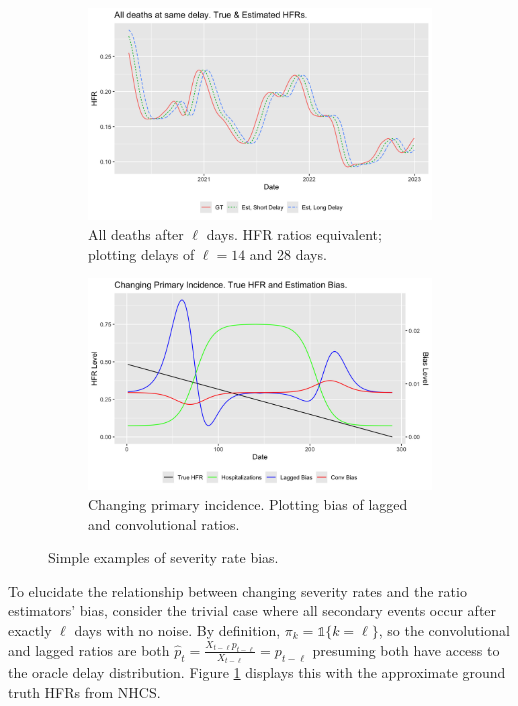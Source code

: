 \documentclass{article}
\begin{document}
\begin{figure}
     \centering
     \begin{subfigure}[b]{0.45\linewidth}
         \centering
         \includegraphics[width=\linewidth]{Figs/sim_onehot.png}
         \caption{All deaths after $\ell$ days. HFR ratios equivalent; plotting delays of $\ell=14$ and 28 days.}
         \label{fig:onehot}
     \end{subfigure}
     \hfill
     \begin{subfigure}[b]{0.45\linewidth}
         \centering
         \includegraphics[width=\linewidth]{Figs/sim_chging_primary.png}
         \caption{Changing primary incidence. Plotting bias of lagged and convolutional ratios.}
         \label{fig:chging_primary}
     \end{subfigure}
        \caption{Simple examples of severity rate bias.}
        \label{fig:bias_ex}
\end{figure}


To elucidate the relationship between changing severity rates and the ratio estimators' bias, consider the trivial case where all secondary events occur after exactly $\ell$ days with no noise. By definition, $\pi_k = \mathds{1}\{k=\ell\}$, so the convolutional and lagged ratios are both $\hat{p}_t = \frac{X_{t-\ell}p_{t-\ell}}{X_{t-\ell}} = p_{t-\ell}$ presuming both have access to the oracle delay distribution. Figure \ref{fig:onehot} displays this with the approximate ground truth HFRs from NHCS. 
\end{document}
